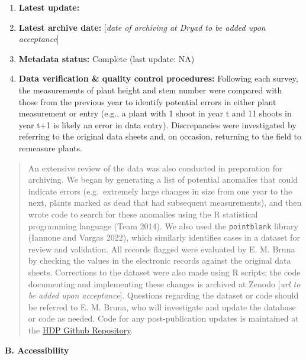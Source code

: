 \documentclass[
  12pt,
  man, donotrepeattitle]{apa6}
\begin{document}
\begin{enumerate}
\def\labelenumi{\arabic{enumi}.}
\item
  \textbf{Latest update:}
\item
  \textbf{Latest archive date:} {[}\emph{date of archiving at Dryad to be added upon acceptance}{]}
\item
  \textbf{Metadata status:} Complete (last update:
  NA)
\item
  \textbf{Data verification \& quality control procedures:} Following each survey, the measurements of plant height and stem number were compared with those from the previous year to identify potential errors in either plant measurement or entry (e.g., a plant with 1 shoot in year t and 11 shoots in year t+1 is likely an error in data entry). Discrepancies were investigated by referring to the original data sheets and, on occasion, returning to the field to remeasure plants.
\end{enumerate}

\begin{quote}
An extensive review of the data was also conducted in preparation for archiving. We began by generating a list of potential anomalies that could indicate errors (e.g.~extremely large changes in size from one year to the next, plants marked as dead that had subsequent measurements), and then wrote code to search for these anomalies using the R statistical programming language (Team 2014). We also used the \texttt{pointblank} library (Iannone and Vargas 2022), which similarly identifies cases in a dataset for review and validation. All records flagged were evaluated by E. M. Bruna by checking the values in the electronic records against the original data sheets. Corrections to the dataset were also made using R scripts; the code documenting and implementing these changes is archived at Zenodo {[}\emph{url to be added upon acceptance}{]}. Questions regarding the dataset or code should be referred to E. M. Bruna, who will investigate and update the database or code as needed. Code for any post-publication updates is maintained at the \href{https://github.com/BrunaLab/HeliconiaSurveys}{HDP Github Repository}.
\end{quote}

\noindent 
\textbf{B. Accessibility}
\end{document}
